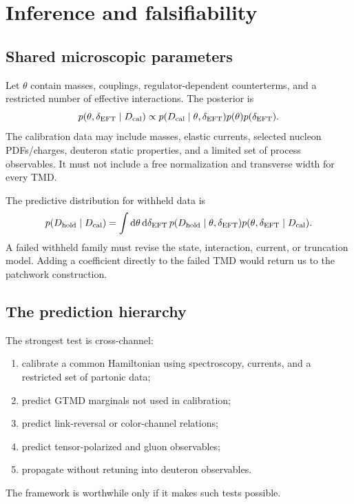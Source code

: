 \documentclass[11pt]{article}
\newcommand{\dd}{\mathrm{d}}
\begin{document}
\section{Inference and falsifiability}

\subsection{Shared microscopic parameters}

Let \(\theta\) contain masses, couplings, regulator-dependent counterterms,
and a restricted number of effective interactions.  The posterior is
\begin{equation}
p(\theta,\delta_{\rm EFT}\mid D_{\rm cal})
\propto
p(D_{\rm cal}\mid\theta,\delta_{\rm EFT})
p(\theta)p(\delta_{\rm EFT}).
\label{eq:posterior}
\end{equation}
The calibration data may include masses, elastic currents, selected
nucleon PDFs/charges, deuteron static properties, and a limited set of
process observables.  It must not include a free normalization and
transverse width for every TMD.

The predictive distribution for withheld data is
\begin{equation}
p(D_{\rm hold}\mid D_{\rm cal})
=\int\dd\theta\,\dd\delta_{\rm EFT}\,
p(D_{\rm hold}\mid\theta,\delta_{\rm EFT})
p(\theta,\delta_{\rm EFT}\mid D_{\rm cal}).
\label{eq:posterior-predictive}
\end{equation}
A failed withheld family must revise the state, interaction, current, or
truncation model.  Adding a coefficient directly to the failed TMD would
return us to the patchwork construction.

\subsection{The prediction hierarchy}

The strongest test is cross-channel:
\begin{enumerate}
\item calibrate a common Hamiltonian using spectroscopy, currents, and a
restricted set of partonic data;
\item predict GTMD marginals not used in calibration;
\item predict link-reversal or color-channel relations;
\item predict tensor-polarized and gluon observables;
\item propagate without retuning into deuteron observables.
\end{enumerate}
The framework is worthwhile only if it makes such tests possible.
\end{document}
